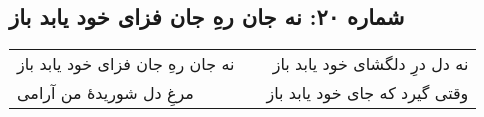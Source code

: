 \begin{center}
\section*{شماره ۲۰: نه جان رهِ جان فزای خود یابد باز}
\label{sec:020}
\begin{longtable}{l p{0.5cm} r}
نه جان رهِ جان فزای خود یابد باز
&&
نه دل درِ دلگشای خود یابد باز
\\
مرغِ دل شوریدهٔ من آرامی
&&
وقتی گیرد که جای خود یابد باز
\\
\end{longtable}
\end{center}
